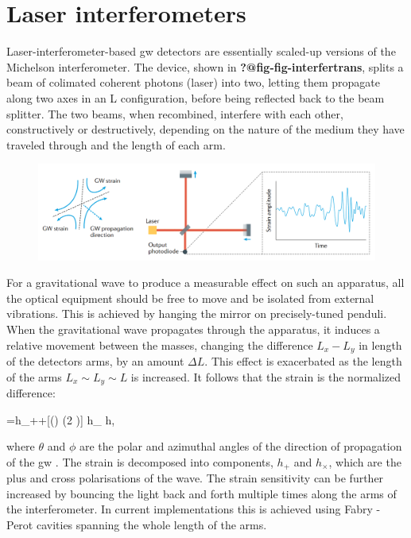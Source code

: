 \documentclass[
  11pt,
  a4paper,
  DIV=11,
  numbers=noendperiod,
  oneside]{scrreprt}
\let\[\relax \let\]\relax %
\DeclareRobustCommand{\[}{\begin{equation}}
\DeclareRobustCommand{\]}{\end{equation}}
\begin{document}
\hypertarget{laser-interferometers}{%
\section{Laser interferometers}\label{laser-interferometers}}

Laser-interferometer-based \gls{gw} detectors are essentially scaled-up
versions of the Michelson interferometer. The device, shown in
\textbf{?@fig-fig-interfertrans}, splits a beam of colimated coherent
photons (laser) into two, letting them propagate along two axes in an L
configuration, before being reflected back to the beam splitter. The two
beams, when recombined, interfere with each other, constructively or
destructively, depending on the nature of the medium they have traveled
through and the length of each arm.

\begin{figure}


{\centering \includegraphics{./interfertrans.png}

}

\end{figure}

For a gravitational wave to produce a measurable effect on such an
apparatus, all the optical equipment should be free to move and be
isolated from external vibrations. This is achieved by hanging the
mirror on precisely-tuned penduli. When the gravitational wave
propagates through the apparatus, it induces a relative movement between
the masses, changing the difference \(L_x-L_y\) in length of the
detectors arms, by an amount \(\Delta L\). This effect is exacerbated as
the length of the arms \(L_x \sim L_y \sim L\) is increased. It follows
that the strain is the normalized difference:

\[
= h_{+}+[\cos (\theta) \sin (2 \phi)] h_{\times} \equiv h,
\]

where \(\theta\) and \(\phi\) are the polar and azimuthal angles of the
direction of propagation of the \gls{gw} . The strain is decomposed into
components, \(h_{+}\) and \(h_{\times}\), which are the plus and cross
polarisations of the wave. The strain sensitivity can be further
increased by bouncing the light back and forth multiple times along the
arms of the interferometer. In current implementations this is achieved
using Fabry - Perot cavities spanning the whole length of the arms.
\end{document}
